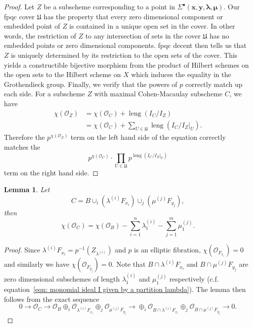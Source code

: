 \documentclass[12pt]{amsart}
\newtheorem{lemma}[theorem]{Lemma}
\theoremstyle{definition}
\renewcommand{\O}{\mathcal{O}}
\newcommand{\boldx}{\boldsymbol{x}}
\newcommand{\boldy}{\boldsymbol{y}}
\newcommand{\boldlambda}{\boldsymbol{\lambda }}
\newcommand{\boldmu}{\boldsymbol{\mu }}
\newcommand{\Sigmaxylambdamu}{\Sigma^{\bullet }(\boldx ,\boldy ,\boldlambda ,\boldmu )}
\newcommand{\length}{\operatorname{leng}}
\begin{document}
\begin{proof}
Let $Z$ be a subscheme corresponding to a point in
$\Sigmaxylambdamu$. Our fpqc cover $\mathfrak{U}$ has the property
that every zero dimensional component or embedded point of $Z$ is
contained in a unique open set in the cover. In other words, the
restriction of $Z$ to any intersection of sets in the cover
$\mathfrak{U}$ has no embedded points or zero dimensional
components. fpqc decent then tells us that $Z$ is uniquely determined
by its restriction to the open sets of the cover. This yields a
constructible bijective morphism from the product of Hilbert schemes
on the open sets to the Hilbert scheme on $X$ which induces the
equality in the Grothendieck group. Finally, we verify that the
powers of $p$ correctly match up each side. For a subscheme $Z$ with
maximal Cohen-Macaulay subscheme $C$, we have
\begin{align*}
\chi (\O_{Z})&=\chi (\O_{C}) +\length (I_{C}/I_{Z})\\
&=\chi (\O_{C}) +\sum_{U\in \mathfrak{U}}\length (I_{C}/I_{Z}|_{U}).
\end{align*}
Therefore the $p^{\chi (\O_{Z})}$ term on the left hand side of the
equation correctly matches the 
\[
p^{\chi (\O_{C})}\cdot \prod_{U\in
\mathfrak{U}}p^{\length (I_{C}/I_{Z}|_{U})}
\]
term on
the right hand side.
\end{proof}

\begin{lemma}\label{lem: chi(C)=chi(B) -sum lamba1 - sum mu1}
Let 
\[
C=B\cup_{i}\left(\lambda^{(i)}F_{x_{i}} \right)\cup_{j}\left(\mu^{(j)}F_{y_{j}} \right),
\]
then
\[
\chi (\O_{C}) = \chi (\O_{B}) -\sum_{i=1}^{n}\lambda^{(i)}_{1}
-\sum_{j=1}^{m}\mu^{(j)}_{1}. 
\]
\end{lemma}
\begin{proof}
Since $\lambda^{(i)}F_{x_{i}}=p^{-1}(Z_{\lambda^{(i)}})$ and $p$ is an
elliptic fibration, $\chi (\O_{F_{x_{i}}})=0$ and similarly we have
$\chi (\O_{F_{y_{j}}})=0$. Note that $B\cap \lambda^{(i)}F_{x_{i}}$
and $B\cap \mu^{(j)}F_{y_{j}}$ are zero dimensional subschemes of
length $\lambda^{(i)}_{1}$ and $\mu^{(j)}_{1} $ respectively
(c.f. equation~\eqref{eqn: monomial ideal I given by a partition
lambda}). The lemma then follows from the exact sequence
\[
0\to \O_{C} \to
\O_{B}\oplus_{i}\O_{\lambda^{(i)}F_{x_{i}}}\oplus_{j}\O_{\mu^{(j)}F_{y_{j}}}
\to \oplus_{i}\O_{B\cap \lambda^{(i)}F_{x_{i}}}\oplus_{j}\O_{B\cap \mu^{(j)}F_{y_{j}}}  \to 0.
\]
\end{proof}
\end{document}
